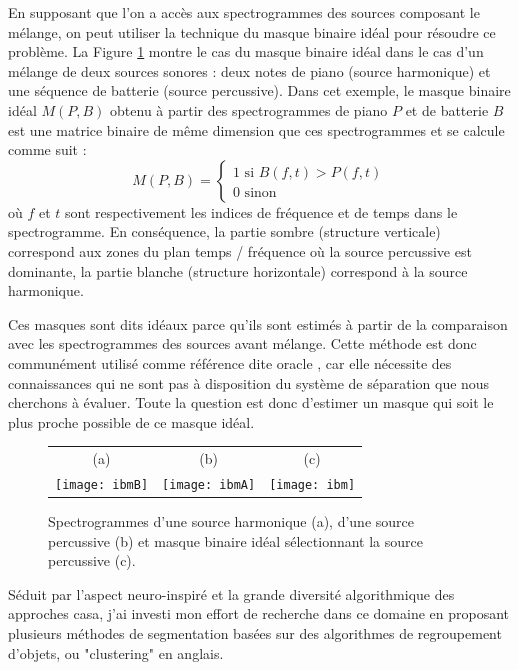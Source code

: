 En supposant que l'on a accès aux spectrogrammes des sources composant le mélange, on peut utiliser la technique du masque binaire idéal pour résoudre ce problème. La Figure \ref{fig:ibm} montre le cas du masque binaire idéal dans le cas d'un mélange de deux sources sonores : deux notes de piano (source harmonique) et une séquence de batterie (source percussive). Dans cet exemple, le masque binaire idéal $M(P, B)$ obtenu à partir des spectrogrammes de piano $P$ et de batterie $B$  est une matrice binaire de même dimension que ces spectrogrammes et se calcule comme suit :
\begin{equation}
M(P, B) =
\begin{cases}
  1 \text{ si } B(f,t)>P(f,t) \\
  0 \text{ sinon}
  \end{cases}
\end{equation}
où $f$ et $t$ sont respectivement les indices de fréquence et de temps dans le spectrogramme. En conséquence, la partie sombre (structure verticale) correspond aux zones du plan temps / fréquence où la source percussive est dominante, la partie blanche (structure horizontale) correspond à la source harmonique.

Ces masques sont dits idéaux parce qu'ils sont estimés à partir de la comparaison avec les spectrogrammes des sources avant mélange. Cette méthode est donc communément utilisé comme référence dite \og oracle \fg, car elle nécessite des connaissances qui ne sont pas à disposition du système de séparation que nous cherchons à évaluer. Toute la question est donc d'estimer un masque qui soit le plus proche possible de ce masque idéal.

\begin{figure}[t]
  \footnotesize
  \begin{tabular}{ccc}
    (a) & (b) & (c)  \\
  \texttt{[image: ibmB]} &
  \texttt{[image: ibmA]} &
  \texttt{[image: ibm]} \\
\end{tabular}
  \caption{Spectrogrammes d'une source harmonique (a), d'une source percussive (b) et masque binaire idéal sélectionnant la source percussive (c).} \label{fig:ibm}
\end{figure}


Séduit par l'aspect neuro-inspiré et la grande diversité algorithmique des approches casa, j'ai investi mon effort de recherche dans ce domaine en proposant plusieurs méthodes de segmentation basées sur des algorithmes de regroupement d'objets, ou "clustering" en anglais.

